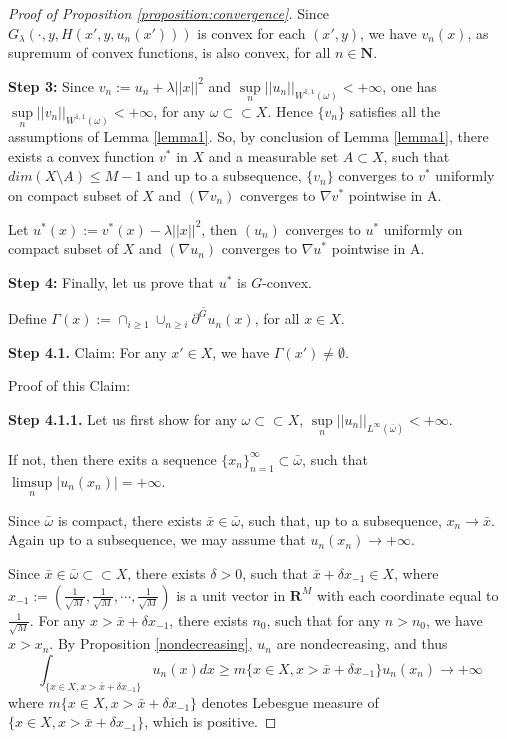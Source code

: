 \documentclass[a4paper, 11pt]{amsart}
\numberwithin{equation}{section}
\theoremstyle{plain}
\theoremstyle{definition}
\theoremstyle{remark}
\newcommand{\R}{\mathbf{R}}
\newcommand{\N}{\mathbf{N}}
\begin{document}
\begin{proof}[Proof of Proposition \ref{proposition:convergence}]
	
	Since $G_{\lambda}(\cdot,y,H(x',y,u_n(x')))$ is convex for each $(x', y)$, we have $v_n(x)$, as supremum of convex functions, is also convex, for all $n \in \N$.\medskip
	
	
	
{\bf Step 3:}	Since $v_n:= u_n +\lambda||x||^2$ and $\sup\limits_{n}||u_n||_{W^{1,1}(\omega)} < +\infty$, one has $\sup\limits_{n}||v_n||_{W^{1,1}(\omega)} < +\infty$, for any $\omega \subset \subset X$. Hence $\{v_n\}$ satisfies all the assumptions of Lemma \ref{lemma1}. So, by conclusion of Lemma \ref{lemma1}, there exists a convex function $v^*$ in $X$ and a measurable set $A \subset X$, such that $dim (X \setminus A)\le M-1$ and up to a subsequence, $\{v_n\}$ converges to $v^*$ uniformly on compact subset of $X$ and $(\nabla v_n)$ converges to $\nabla v^*$ pointwise in A.
	
	Let $u^*(x):=v^*(x)-\lambda||x||^2$, then  $(u_n)$ converges to $u^*$ uniformly on compact subset of $X$ and $(\nabla u_n)$ converges to $\nabla u^*$ pointwise in A.\medskip
	
{\bf Step 4:}	Finally, let us prove that $u^*$ is $G$-convex.\medskip

	Define $\Gamma(x):=\cap_{i\ge 1}\overline{\cup_{n\ge i}\partial^G u_n(x)}$, for all $x\in X$.\medskip
	
	
{\bf	Step 4.1.} Claim: For any $x'\in X$, we have $\Gamma(x') \neq \emptyset$.\medskip
	
	Proof of this Claim: 
	
	{\bf Step 4.1.1.} Let us first show for any $\omega \subset\subset X$, $\sup\limits_{n}||u_n||_{L^{\infty}(\bar{\omega})}<+\infty$.
	
	If not, then there exits a sequence $\{x_n\}_{n=1}^{\infty}\subset \bar{\omega}$, such that $\limsup\limits_{n}|u_n(x_n)|=+\infty$.
	
	Since $\bar{\omega}$ is compact, there exists $\bar{x}\in \bar{\omega}$, such that, up to a subsequence, $x_n\longrightarrow \bar{x}$. Again up to a subsequence, we may assume that $u_n(x_n)\longrightarrow +\infty$.
	
	Since $\bar{x} \in \bar{\omega} \subset \subset X$, there exists $\delta >0$, such that $\bar{x}+\delta x_{-1} \in X$, where $x_{-1}:=(\frac{1}{\sqrt{M}}, \frac{1}{\sqrt{M}}, \cdots, \frac{1}{\sqrt{M}})$ is a unit vector in $\R^M$ with each coordinate equal to $\frac{1}{\sqrt{M}}$. For any $x>\bar{x} + \delta x_{-1}$, there exists $n_0$, such that for any $n>n_0$, we have $x>x_n$. By Proposition \ref{nondecreasing}, $u_n$ are nondecreasing, and thus
	\begin{equation}\label{eqn_integral}
	\int_{\{x\in X, x>\bar{x} +\delta x_{-1}\}} u_n(x)dx \ge m\{x\in X, x> \bar{x}+\delta x_{-1}\} u_n(x_n)\longrightarrow +\infty
	\end{equation}
	where $m\{x\in X, x>\bar{x}+\delta x_{-1}\}$ denotes Lebesgue measure of $\{x\in X, x>\bar{x}+\delta x_{-1}\}$, which is positive.
	

\end{proof}
\end{document}
